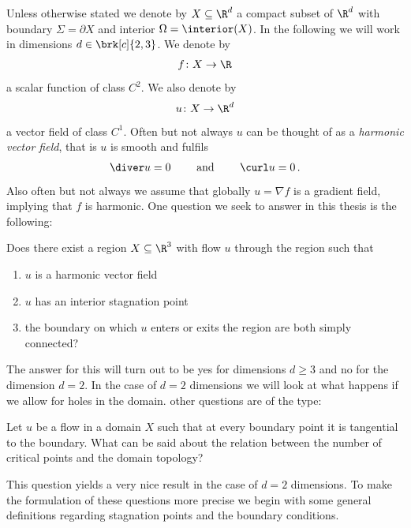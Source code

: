 Unless otherwise stated we denote by $X\subseteq\R^d$ a compact subset of $\R^d$ with boundary $\Sigma=\partial X$ and interior
$\Omega=\interior(X)$.
In the following we will work in dimensions $d\in\brk[c]{2,3}$.
We denote by
\begin{align*}
  f\colon X\to\R
\end{align*}
a scalar function of class $C^2$.
We also denote by
\begin{align*}
  u\colon X\to\R^d
\end{align*}
a vector field of class $C^1$.
Often but not always $u$ can be thought of as 
a \emph{harmonic vector field}, that is $u$ is smooth and fulfils
\begin{align*}
  \diver u=0 \qquad \text{ and }\qquad \curl u=0\,.
\end{align*}
Also often but not always we assume that globally $u=\nabla f$ is a gradient field, implying that $f$ is harmonic.
One question we seek to answer in this thesis is the following:
\begin{question}\label{qu:flowthroughStagnationPoint}
  Does there exist a region $X\subseteq\R^3$ with flow $u$ through the region such that
  \begin{enumerate}
    \item $u$ is a harmonic vector field
    \item $u$ has an interior stagnation point
    \item the boundary on which $u$ enters or exits the region are both simply connected?
  \end{enumerate}
\end{question}
The answer for this will turn out to be yes for dimensions $d\geq3$ and no for the dimension $d=2$.
In the case of $d=2$ dimensions we will look at what happens if we allow for holes in the domain.
other questions are of the type:
\begin{question}
  Let $u$ be a flow in a domain $X$ such that at every boundary point it is tangential to the boundary.
  What can be said about the relation between the number of critical points and the domain topology?
\end{question}
This question yields a very nice result in the case of $d=2$ dimensions.
To make the formulation of these questions more precise we begin with some general definitions regarding stagnation points and the boundary conditions.


